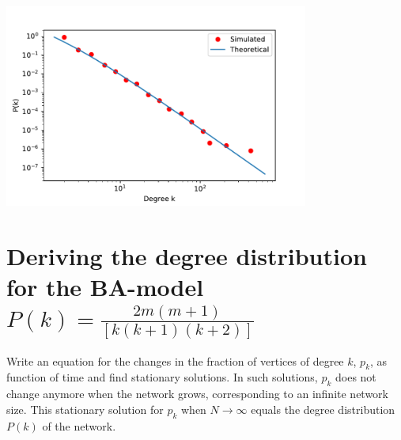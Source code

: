 \documentclass[a4paper,12pt]{article}
\begin{document}
\begin{itemize}
\begin{minipage}{\textwidth}
  \centering
  \includegraphics[width=0.75\textwidth]{assets/BA_degree_distribution.pdf}
\end{minipage}

\end{itemize}

\section{Deriving the degree distribution for the BA-model $P (k) = \frac{2m (m + 1)}{[k (k + 1) (k + 2)]}$}

Write an equation for the changes
in the fraction of vertices of degree $k$, $p_k$, as function of time and find stationary solutions. In such solutions, $p_k$ does not change anymore when the network grows,
corresponding to an infinite network size.
This stationary solution for $p_k$ when $N \rightarrow \infty$ equals the degree distribution
$P(k)$ of the network.
\end{document}
